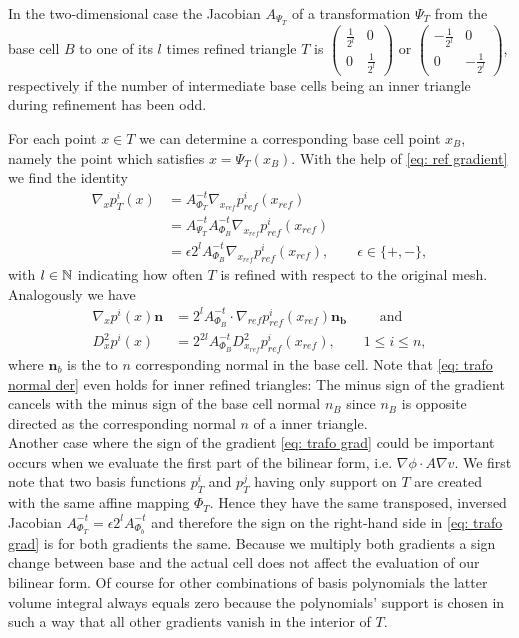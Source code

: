\begin{example}\label{ex: leaf cell trafo}
In the two-dimensional case the Jacobian $A_{\Psi_T}$ of a transformation $\Psi_T$ from the base cell $B$ to one of its $l$ times refined triangle $T$ is $
	\begin{pmatrix}
		\frac 1 {2^l} & 0 \\ 0 & \frac 1 {2^l}
	\end{pmatrix} \text{ or }
	\begin{pmatrix}
		-\frac 1 {2^l} & 0 \\ 0 & -\frac 1 {2^l}
	\end{pmatrix}$, respectively if the number of intermediate base cells being an inner triangle during refinement  has been odd.

 For each point $x \in T$ we can determine a corresponding base cell point $x_B$, namely the point which satisfies $x = \Psi_T(x_B)$. With the help of \eqref{eq: ref gradient} we find the identity
\begin{align}
\nabla_x p_T^i(x) &= A_{\Phi_T}^{-t} \nabla_{x_{ref}} p^i_{ref} (x_{ref}) \nonumber\\
 &= A_{\Psi_T}^{-t} A_{\Phi_B}^{-t} \nabla_{x_{ref}} p^i_{ref} (x_{ref}) \nonumber\\
&= \epsilon 2^l A_{\Phi_B}^{-t} \nabla_{x_{ref}} p^i_{ref}(x_{ref}), \qquad \epsilon \in \{+,-\} \label{eq: trafo grad},
\end{align}
with $l \in \mathbb{N}$ indicating how often $T$ is refined with respect to the original mesh.\\
Analogously we have
\begin{align}
\nabla_x p^i(x) \mathbf n &= 2^l  A_{\Phi_B}^{-t} \cdot \nabla_{ref}p^i_{ref}(x_{ref}) \mathbf{ n_{b}} \qquad \text{ and } \label{eq: trafo normal der} \\
D_x^2 p^i(x) &= 2^{2l}  A_{\Phi_B}^{-t} D_{x_{ref}}^2 p^i_{ref}(x_{ref}), \qquad 1 \leq i \leq n,
\end{align}
where $\mathbf n_b$ is the to $n$ corresponding normal in the base cell. Note that \eqref{eq: trafo normal der} even holds for inner refined triangles: The minus sign of the gradient cancels with the minus sign of the base cell normal $n_B$ since $n_B$ is opposite directed as the corresponding normal $n$ of a inner triangle.\\
Another case where the sign of the gradient \eqref{eq: trafo grad} could be important occurs when we evaluate the first part of the bilinear form, i.e. $\nabla \phi \cdot A \nabla v$. We first note that two basis functions $p_T^i$ and $p_T^j$ having only support on $T$ are created with the same affine mapping $\Phi_T$. Hence they have the same transposed, inversed Jacobian $A^{-t}_{\Phi_T}=\epsilon 2^l A_{\Phi_b}^{-t}$ and therefore the sign on the right-hand side in \eqref{eq: trafo grad} is for both gradients the same. Because we multiply both gradients a sign change between base and the actual cell does not affect the evaluation of our bilinear form. 
Of course for other combinations of basis polynomials the latter volume integral always equals zero because the polynomials' support is chosen in such a way that all other gradients vanish in the interior of $T$.


\end{example}
